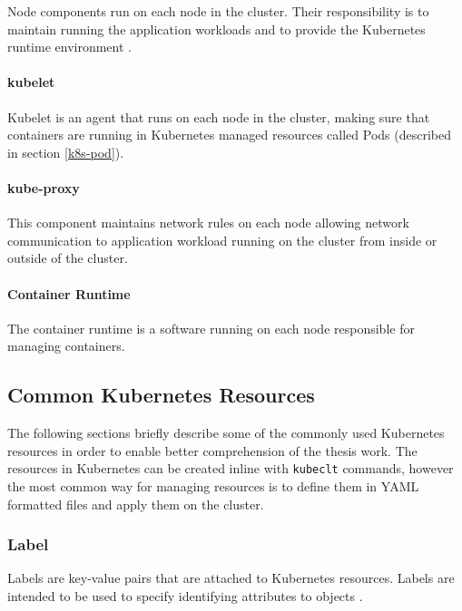Node components run on each node in the cluster. Their responsibility is to maintain running the application workloads and to provide the Kubernetes runtime environment \cite{KubernetesArchitecture}.

\paragraph{kubelet} Kubelet is an agent that runs on each node in the cluster, making sure that containers are running in Kubernetes managed resources called Pods (described in section \ref{k8s-pod}).

\paragraph{kube-proxy} This component maintains network rules on each node allowing network communication to application workload running on the cluster from inside or outside of the cluster.

\paragraph{Container Runtime} The container runtime is a software running on each node responsible for managing containers.

\subsection{Common Kubernetes Resources}

The following sections briefly describe some of the commonly used Kubernetes resources in order to enable better comprehension of the thesis work. The resources in Kubernetes can be created inline with \texttt{kubeclt} commands, however the most common way for managing resources is to define them in YAML formatted files and apply them on the cluster.

\subsubsection{Label}

Labels are key-value pairs that are attached to Kubernetes resources. Labels are intended to be used to specify identifying attributes to objects \cite{KubernetesLabel}.

